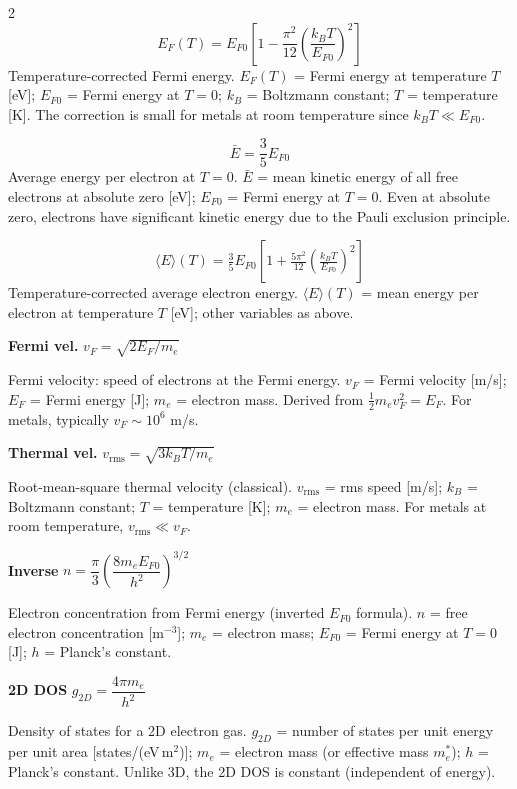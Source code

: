 \documentclass[9pt]{extarticle}
\newcommand{\eqlabel}[1]{\textbf{\scriptsize #1}\;}
\newcommand{\desc}[1]{{\small\color{desc}#1}}
\begin{document}
\begin{multicols}{2}
\[E_F(T) = E_{F0}\!\left[1 - \frac{\pi^2}{12}\!\left(\frac{k_BT}{E_{F0}}\right)^{\!2}\right]\]
\desc{Temperature-corrected Fermi energy. $E_F(T)$ = Fermi energy at temperature $T$ [eV]; $E_{F0}$ = Fermi energy at $T = 0$; $k_B$ = Boltzmann constant; $T$ = temperature [K]. The correction is small for metals at room temperature since $k_BT \ll E_{F0}$.}

\[\bar{E} = \frac{3}{5}E_{F0}\]
\desc{Average energy per electron at $T = 0$. $\bar{E}$ = mean kinetic energy of all free electrons at absolute zero [eV]; $E_{F0}$ = Fermi energy at $T = 0$. Even at absolute zero, electrons have significant kinetic energy due to the Pauli exclusion principle.}

\[\langle E \rangle(T) = \tfrac{3}{5}E_{F0}\!\left[1 + \tfrac{5\pi^2}{12}\!\left(\tfrac{k_BT}{E_{F0}}\right)^{\!2}\right]\]
\desc{Temperature-corrected average electron energy. $\langle E \rangle(T)$ = mean energy per electron at temperature $T$ [eV]; other variables as above.}

\eqlabel{Fermi vel.} $v_F = \sqrt{2E_F/m_e}$

\desc{Fermi velocity: speed of electrons at the Fermi energy. $v_F$ = Fermi velocity [m/s]; $E_F$ = Fermi energy [J]; $m_e$ = electron mass. Derived from $\frac{1}{2}m_ev_F^2 = E_F$. For metals, typically $v_F \sim 10^6$ m/s.}

\eqlabel{Thermal vel.} $v_{\text{rms}} = \sqrt{3k_BT/m_e}$

\desc{Root-mean-square thermal velocity (classical). $v_{\text{rms}}$ = rms speed [m/s]; $k_B$ = Boltzmann constant; $T$ = temperature [K]; $m_e$ = electron mass. For metals at room temperature, $v_{\text{rms}} \ll v_F$.}

\eqlabel{Inverse} $n = \dfrac{\pi}{3}\!\left(\dfrac{8m_eE_{F0}}{h^2}\right)^{3/2}$

\desc{Electron concentration from Fermi energy (inverted $E_{F0}$ formula). $n$ = free electron concentration [m$^{-3}$]; $m_e$ = electron mass; $E_{F0}$ = Fermi energy at $T = 0$ [J]; $h$ = Planck's constant.}

\eqlabel{2D DOS} $g_{2D} = \dfrac{4\pi m_e}{h^2}$

\desc{Density of states for a 2D electron gas. $g_{2D}$ = number of states per unit energy per unit area [states/(eV\,m$^2$)]; $m_e$ = electron mass (or effective mass $m_e^*$); $h$ = Planck's constant. Unlike 3D, the 2D DOS is constant (independent of energy).}



\end{multicols}
\end{document}
